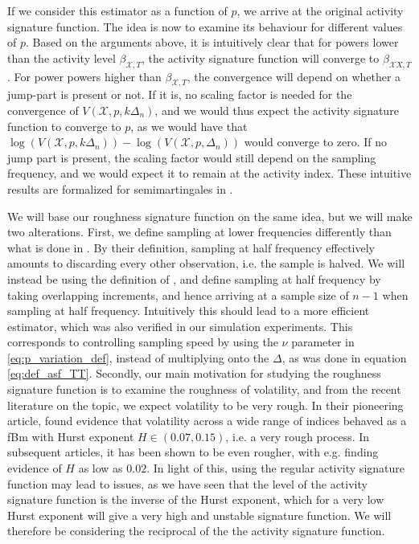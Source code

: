 \documentclass[fleqn,11pt,letterpaper]{article}
\theoremstyle{plain}
\theoremstyle{definition}
\theoremstyle{remark}
\numberwithin{equation}{section}
\begin{document}
If we consider this estimator as a function of $p$, we arrive at the original activity signature function. The idea is now to examine its behaviour for different values of $p$. Based on the arguments above, it is intuitively clear that for powers lower than the activity level $\beta_{\mathcal{X},T}$, the activity signature function will converge to $\beta_{\mathcal{X}X,T}$. For power powers higher than $\beta_{\mathcal{X},T}$, the convergence will depend on whether a jump-part is present or not. If it is, no scaling factor is needed for the convergence of $V(\mathcal{X},p,k\Delta_n)$, and we would thus expect the activity signature function to converge to $p$, as we would have that $\log(V(\mathcal{X},p,k\Delta_n))-\log(V(\mathcal{X},p,\Delta_n))$ would converge to zero. If no jump part is present, the scaling factor would still depend on the sampling frequency, and we would expect it to remain at the activity index. These intuitive results are formalized for semimartingales in \cite{Todorov2010}.

We will base our roughness signature function on the same idea, but we will make two alterations. First, we define sampling at lower frequencies differently than what is done in \cite{Todorov2010}. By their definition, sampling at half frequency effectively amounts to discarding every other observation, i.e. the sample is halved. We will instead be using the definition of \cite{Corcuera2013}, and define sampling at half frequency by taking overlapping increments, and hence arriving at a sample size of $n-1$ when sampling at half frequency. Intuitively this should lead to a more efficient estimator, which was also verified in our simulation experiments. This corresponds to controlling sampling speed by using the $\nu$ parameter in \eqref{eq:p_variation_def}, instead of multiplying onto the $\Delta$, as was done in equation \eqref{eq:def_asf_TT}. Secondly, our main motivation for studying the roughness signature function is to examine the roughness of volatility, and from the recent literature on the topic, we expect volatility to be very rough. In their pioneering article, \cite{Gatheral2018} found evidence that volatility across a wide range of indices behaved as a fBm with Hurst exponent $H\in(0.07,0.15)$, i.e. a very rough process. In subsequent articles, it has been shown to be even rougher, with e.g. \cite{BCSV2020} finding evidence of $H$ as low as $0.02$. In light of this, using the regular activity signature function may lead to issues, as we have seen that the level of the activity signature function is the inverse of the Hurst exponent, which for a very low Hurst exponent will give a very high and unstable signature function. We will therefore be considering the reciprocal of the the activity signature function.  
\end{document}
